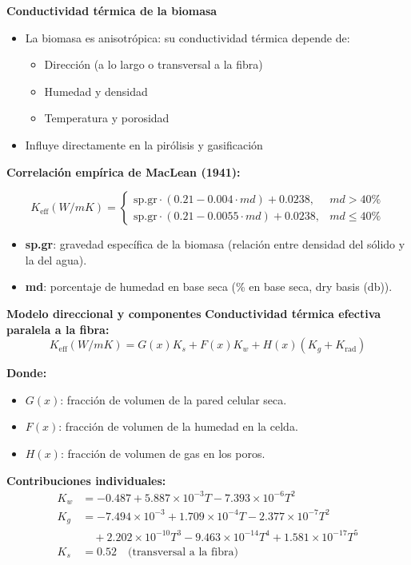 \documentclass[../../main.tex]{subfiles}
\begin{document}
\begin{frame}{\textbf{Conductividad t\'ermica de la biomasa}}
\begin{itemize}
  \item La biomasa es anisotr\'opica: su conductividad t\'ermica depende de:
  \begin{itemize}
    \item Direcci\'on (a lo largo o transversal a la fibra)
    \item Humedad y densidad
    \item Temperatura y porosidad
  \end{itemize}
  \item Influye directamente en la pir\'olisis y gasificaci\'on
\end{itemize}

\textbf{Correlaci\'on emp\'irica de MacLean (1941):}

\[
K_{\text{eff}}(W/m K) =
\begin{cases}
\text{sp.gr} \cdot (0.21 - 0.004 \cdot md) + 0.0238, & md > 40\% \\
\text{sp.gr} \cdot (0.21 - 0.0055 \cdot md) + 0.0238, & md \leq 40\%
\end{cases}
\]

\begin{itemize}
  \item \textbf{sp.gr}: gravedad espec\'ifica de la biomasa (relaci\'on entre densidad del s\'olido y la del agua).
  \item \textbf{md}: porcentaje de humedad en base seca (\% en base seca, dry basis (db)).
\end{itemize}
\end{frame}

\begin{frame}{\textbf{Modelo direccional y componentes}} 
\textbf{Conductividad t\'ermica efectiva paralela a la fibra:}
\[
K_{\text{eff}}(W/m K) = G(x) K_s + F(x) K_w + H(x) (K_g + K_{\text{rad}})
\]

\textbf{Donde:}
\begin{itemize}
  \item \( G(x) \): fracci\'on de volumen de la pared celular seca.
  \item \( F(x) \): fracci\'on de volumen de la humedad en la celda.
  \item \( H(x) \): fracci\'on de volumen de gas en los poros.
\end{itemize}

\textbf{Contribuciones individuales:}
\[
\begin{aligned}
K_w &=-0.487 + 5.887\times10^{-3}T - 7.393\times10^{-6}T^2 \\
K_g &= -7.494\times10^{-3} + 1.709\times10^{-4}T - 2.377\times10^{-7}T^2 \\ &\quad + 2.202\times10^{-10}T^3 - 9.463\times10^{-14}T^4 + 1.581\times10^{-17}T^5 \\
K_s &= 0.52 \quad \text{(transversal a la fibra)}
\end{aligned}
\]
\end{frame}
\end{document}
